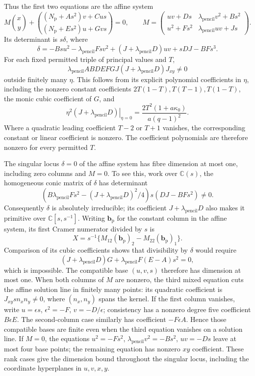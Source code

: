 \documentclass[11pt,a4paper]{article}
\numberwithin{equation}{section}
\theoremstyle{plain}
\theoremstyle{definition}
\theoremstyle{remark}
\begin{document}
Thus the first two equations are the affine system
\[
 M\binom{x}{y}+\binom{(N_{\mathrm p}+As^2)v+Cus}{(N_{\mathrm p}+Es^2)u+Gvs}=0,
 \qquad
 M=\begin{pmatrix}
 uv+Ds&\lambda_{\mathrm{pencil}} v^2+Bs^2\\
 u^2+Fs^2&\lambda_{\mathrm{pencil}} uv+Js
 \end{pmatrix}.
\]
Its determinant is $s\delta$, where
\[
 \delta=-Bsu^2-\lambda_{\mathrm{pencil}} Fsv^2+(J+\lambda_{\mathrm{pencil}} D)uv+sDJ-BFs^3.
\]
For each fixed permitted triple of principal values and \(T\),
\[
 \lambda_{\mathrm{pencil}} ABDEFGJ(J+\lambda_{\mathrm{pencil}} D)J_{xy}\ne0
\]
outside finitely many \(\eta\). This follows from its explicit polynomial coefficients in
\(\eta\), including the nonzero constant coefficients
\(2T(1-T),T(T-1),T(1-T)\), the monic cubic coefficient of \(G\), and
\[
 \left.\eta^2(J+\lambda_{\mathrm{pencil}} D)\right|_{\eta=0}
 =\frac{2T^2(1+a\kappa_0 )}{a(q-1)^2}.
\]
Where a quadratic leading coefficient \(T-2\) or \(T+1\) vanishes, the
corresponding constant or linear coefficient is nonzero. The coefficient
polynomials are therefore nonzero for every permitted \(T\).

The singular locus \(\delta=0\) of the affine system has fibre dimension at most
one, including zero columns and \(M=0\).  To see this, work over \(\mathbb C(s)\), the homogeneous conic
matrix of \(\delta\) has determinant
\[
 (B\lambda_{\mathrm{pencil}} Fs^2-(J+\lambda_{\mathrm{pencil}}D)^2/4)s(DJ-BFs^2)\ne0.
\]
Consequently \(\delta\) is absolutely irreducible; its coefficient
\(J+\lambda_{\mathrm{pencil}}D\) also makes it primitive over \(\mathbb C[s,s^{-1}]\).
Writing $\mathbf b_{\mathrm p}$ for the constant column in the affine
system, its first Cramer numerator divided by $s$ is
\[
 X=s^{-1}\{M_{12}(\mathbf b_{\mathrm p})_2
              -M_{22}(\mathbf b_{\mathrm p})_1\}.
\]
Comparison of
its cubic coefficients shows that divisibility by \(\delta\) would require
\[
 (J+\lambda_{\mathrm{pencil}}D)G+\lambda_{\mathrm{pencil}} F(E-A)s^2=0,
\]
which is impossible.  The compatible base \((u,v,s)\) therefore has
dimension at most one.  When both columns of \(M\) are nonzero, the third
mixed equation cuts the affine solution line in finitely many points:
its quadratic coefficient is \(J_{xy}s n_xn_y\ne0\), where
\((n_x,n_y)\) spans the kernel.
If the first column vanishes, write \(u=\epsilon s\),
\(\epsilon^2=-F\), \(v=-D/\epsilon\); consistency has a nonzero
degree five coefficient \(B\epsilon E\).  The second-column case similarly
has coefficient \(-F\epsilon A\).  Hence those compatible bases are
finite even when the third equation vanishes on a solution line.
If \(M=0\), the equations \(u^2=-Fs^2\),
\(\lambda_{\mathrm{pencil}} v^2=-Bs^2\), \(uv=-Ds\) leave at most four base points;
the remaining equation has nonzero \(xy\) coefficient. These rank cases
give the dimension bound throughout the singular locus, including the
coordinate hyperplanes in \(u,v,x,y\).
\end{document}
